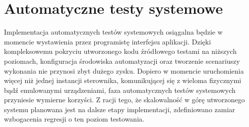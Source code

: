 \newpage
\section{Automatyczne testy systemowe}
Implementacja automatycznych testów systemowych osiągalna będzie w momencie wystawienia przez programistę interfejsu aplikacji. Dzięki kompleksowemu pokryciu utworzonego
kodu źródłowego testami na niższych poziomach, konfiguracja środowiska automatyzacji oraz tworzenie scenariuszy wykonania nie przynosi zbyt dużego zysku. 
Dopiero w momencie uruchomienia więcej niż jednej instancji sterownika, komunikującej się z wieloma fizycznymi bądź emulowanymi urządzeniami, faza automatycznych testów
systemowych przyniesie wymierne korzyści. Z racji tego, że skalowalność w górę utworzonego systemu planowana jest na dalsze etapy implementacji, zdefiniowano zamiar
wzbogacenia regresji o ten poziom testowania.
